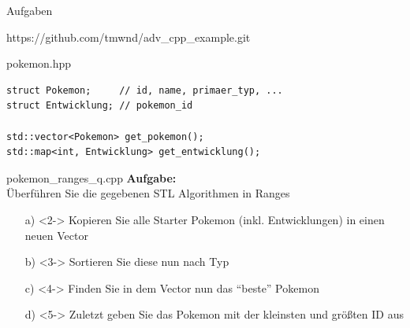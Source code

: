 \begin{frame}{Aufgaben}
    \begin{center}
        https://github.com/tmwnd/adv\_cpp\_example.git
    \end{center}
\end{frame}

\begin{frame}[fragile]{pokemon.hpp}
    \begin{verbatim}
struct Pokemon;     // id, name, primaer_typ, ...
struct Entwicklung; // pokemon_id

std::vector<Pokemon> get_pokemon();
std::map<int, Entwicklung> get_entwicklung();
    \end{verbatim}
\end{frame}



\begin{frame}{pokemon\_ranges\_q.cpp}
    \textbf{Aufgabe:}\\
    Überführen Sie die gegebenen STL Algorithmen in Ranges

    \vspace{1.5em}

    \begin{enumerate} %
        \item[a)]<2-> Kopieren Sie alle Starter Pokemon (inkl. Entwicklungen) in einen neuen Vector
        \item[b)]<3-> Sortieren Sie diese nun nach Typ
        \item[c)]<4-> Finden Sie in dem Vector nun das \enquote{beste} Pokemon
        \item[d)]<5-> Zuletzt geben Sie das Pokemon mit der kleinsten und größten ID aus
    \end{enumerate}
\end{frame}

